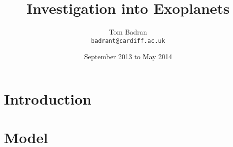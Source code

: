 \documentclass[10pt,a4paper]{article}
\title{Investigation into Exoplanets}
\author{Tom Badran \\ \texttt{badrant@cardiff.ac.uk}}
\date{September 2013 to May 2014}
\numberwithin{equation}{section}
\begin{document}
\maketitle

\abstract



\section{Introduction}



\section{Model}


\begin{multicols}{2}
\printbibliography
\end{multicols}
\end{document}
